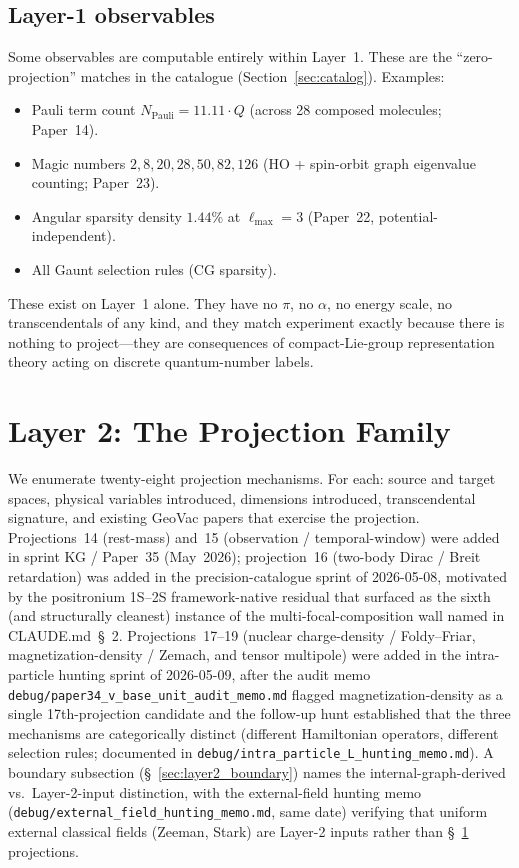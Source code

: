 \documentclass[11pt]{article}
\begin{document}
\subsection{Layer-1 observables}
\label{sec:layer1_obs}
Some observables are computable entirely within Layer~1.  These are
the ``zero-projection'' matches in the catalogue
(Section~\ref{sec:catalog}).  Examples:
\begin{itemize}
\setlength\itemsep{0pt}
\item Pauli term count $N_\text{Pauli} = 11.11 \cdot Q$ (across 28
composed molecules; Paper~14).
\item Magic numbers $2, 8, 20, 28, 50, 82, 126$ (HO + spin-orbit
graph eigenvalue counting; Paper~23).
\item Angular sparsity density $1.44\%$ at $\ell_\text{max}=3$
(Paper~22, potential-independent).
\item All Gaunt selection rules (CG sparsity).
\end{itemize}
These exist on Layer~1 alone.  They have no $\pi$, no $\alpha$, no
energy scale, no transcendentals of any kind, and they match
experiment exactly because there is nothing to project---they are
consequences of compact-Lie-group representation theory acting on
discrete quantum-number labels.

\section{Layer 2: The Projection Family}
\label{sec:layer2}

We enumerate twenty-eight projection mechanisms.  For each: source and
target spaces, physical variables introduced, dimensions
introduced, transcendental signature, and existing GeoVac papers
that exercise the projection.  Projections~14 (rest-mass) and~15
(observation / temporal-window) were added in sprint KG / Paper~35
(May~2026); projection~16 (two-body Dirac / Breit retardation) was
added in the precision-catalogue sprint of 2026-05-08, motivated by
the positronium 1S--2S framework-native residual that surfaced as
the sixth (and structurally cleanest) instance of the
multi-focal-composition wall named in CLAUDE.md~\S~2.
Projections~17--19 (nuclear charge-density / Foldy--Friar,
magnetization-density / Zemach, and tensor multipole) were added in
the intra-particle hunting sprint of 2026-05-09, after the audit
memo \texttt{debug/paper34\_v\_base\_unit\_audit\_memo.md} flagged
magnetization-density as a single 17th-projection candidate and the
follow-up hunt established that the three mechanisms are
categorically distinct (different Hamiltonian operators, different
selection rules; documented in
\texttt{debug/intra\_particle\_L\_hunting\_memo.md}).  A boundary
subsection (\S~\ref{sec:layer2_boundary}) names the
internal-graph-derived vs.\ Layer-2-input distinction, with the
external-field hunting memo
(\texttt{debug/external\_field\_hunting\_memo.md}, same date)
verifying that uniform external classical fields (Zeeman, Stark) are
Layer-2 inputs rather than \S~\ref{sec:layer2} projections.
\end{document}
